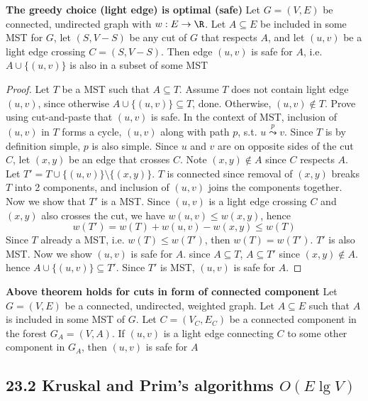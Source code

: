 \documentclass[11pt]{article}
\begin{document}
\begin{theorem*}
    \textbf{The greedy choice (light edge) is optimal (safe)} Let $G = (V,E)$ be connected, undirected graph with $w:E\to \R$. Let $A\subseteq E$ be included in some MST for $G$, let $(S,V-S)$ be any cut of $G$ that respects $A$, and let $(u,v)$ be a light edge crossing $C = (S,V-S)$. Then edge $(u,v)$ is safe for $A$, i.e. $A \cup \{(u,v) \}$ is also in a subset of some MST
    \begin{proof}
        Let $T$ be a MST such that $A\subseteq T$. Assume $T$ does not contain light edge $(u,v)$, since otherwise $A \cup \{(u,v) \} \subseteq T$, done. Otherwise, $(u,v) \not\in T$. Prove using cut-and-paste that $(u,v)$ is safe. In the context of MST, inclusion of $(u,v)$ in $T$ forms a cycle, $(u,v)$ along with path $p$, s.t. $u \overset{p}{\leadsto} v$. Since $T$ is by definition simple, $p$ is also simple. Since $u$ and $v$ are on opposite sides of the cut $C$, let $(x,y)$ be an edge that crosses $C$. Note $(x,y) \not\in A$ since $C$ respects $A$. Let $T' = T \cup \{(u,v) \} \setminus \{ (x,y) \}$. $T$ is connected since removal of $(x,y)$ breaks $T$ into 2 components, and inclusion of $(u,v)$ joins the components together. Now we show that $T'$ is a MST. Since $(u,v)$ is a light edge crossing $C$ and $(x,y)$ also crosses the cut, we have $w(u,v) \leq w(x,y)$, hence 
        \[
            w(T') = w(T) + w(u,v) - w(x,y) \leq w(T)
        \]
        Since $T$ already a MST, i.e. $w(T) \leq w(T')$, then $w(T) = w(T')$. $T'$ is also MST. Now we show $(u,v)$ is safe for $A$. since $A\subseteq T$, $A\subseteq T'$ since $(x,y) \not\in A$. hence $A \cup \{ (u,v)\} \subseteq T'$. Since $T'$ is MST, $(u,v)$ is safe for $A$.
    \end{proof}
\end{theorem*}



\begin{corollary*}
    \textbf{Above theorem holds for cuts in form of connected component} Let $G =(V,E)$ be a connected, undirected, weighted graph. Let $A\subseteq E$ such that $A$ is included in some MST of $G$. Let $C = (V_C, E_C)$ be a connected component in the forest $G_A = (V,A)$. If $(u,v)$ is a light edge connecting $C$ to some other component in $G_A$, then $(u,v)$ is safe for $A$
\end{corollary*}


\subsection*{23.2 Kruskal and Prim's algorithms $O(E\lg V)$}
\end{document}
